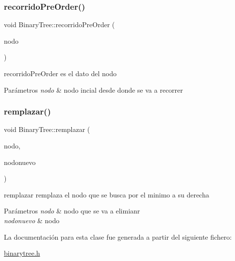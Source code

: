 \subsubsection{\texorpdfstring{recorrido\+Pre\+Order()}{recorridoPreOrder()}}
{\footnotesize\ttfamily void Binary\+Tree\+::recorrido\+Pre\+Order (\begin{DoxyParamCaption}\item[{\mbox{\hyperlink{class_tree_node}{Tree\+Node}} $\ast$}]{nodo }\end{DoxyParamCaption})\hspace{0.3cm}{\ttfamily [inline]}}



recorrido\+Pre\+Order es el dato del nodo 


\begin{DoxyParams}{Parámetros}
{\em nodo} & nodo incial desde donde se va a recorrer \\
\hline
\end{DoxyParams}
\mbox{\label{class_binary_tree_a9fe0609a3ea42f1e3062e25e43fea81b}} 
\subsubsection{\texorpdfstring{remplazar()}{remplazar()}}
{\footnotesize\ttfamily void Binary\+Tree\+::remplazar (\begin{DoxyParamCaption}\item[{\mbox{\hyperlink{class_tree_node}{Tree\+Node}} $\ast$}]{nodo,  }\item[{\mbox{\hyperlink{class_tree_node}{Tree\+Node}} $\ast$}]{nodonuevo }\end{DoxyParamCaption})\hspace{0.3cm}{\ttfamily [inline]}}



remplazar remplaza el nodo que se busca por el minimo a su derecha 


\begin{DoxyParams}{Parámetros}
{\em nodo} & nodo que se va a elimianr \\
\hline
{\em nodonuevo} & nodo \\
\hline
\end{DoxyParams}


La documentación para esta clase fue generada a partir del siguiente fichero\+:\begin{DoxyCompactItemize}
\item 
\mbox{\hyperlink{binarytree_8h}{binarytree.\+h}}\end{DoxyCompactItemize}
